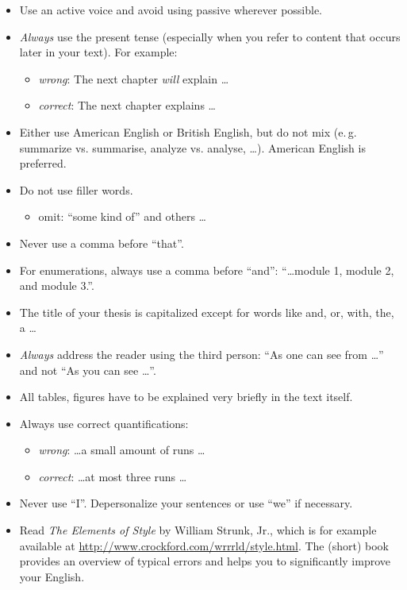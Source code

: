 \begin{itemize}
\item Use an active voice and avoid using passive wherever possible.
\item \emph{Always} use the present tense (especially when you refer to content that occurs later in your text). For example:
	\begin{itemize}
	\item \emph{wrong}: The next chapter \emph{will} explain \dots
	\item \emph{correct}: The next chapter explains \dots
	\end{itemize}
\item Either use American English or British English, but do not mix (e.\,g. summarize vs. summarise, analyze vs. analyse, \dots). American English is preferred.
\item Do not use filler words.
	\begin{itemize}
	\item omit: \enquote{some kind of} and others \dots
	\end{itemize}
\item Never use a comma before \enquote{that}.
\item For enumerations, always use a comma before \enquote{and}: \enquote{\dots module 1, module 2, and module 3.}.
\item The title of your thesis is capitalized except for words like and, or, with, the, a \dots
\item \emph{Always} address the reader using the third person: \enquote{As one can see from \dots} and not \enquote{As you can see \dots}.
\item All tables, figures have to be explained very briefly in the text itself.
\item Always use correct quantifications:
	\begin{itemize}
	\item \emph{wrong}: \dots a small amount of runs \dots
	\item \emph{correct}: \dots at most three runs \dots
	\end{itemize}
\item Never use \enquote{I}. Depersonalize your sentences or use \enquote{we} if necessary.
\item Read \emph{The Elements of Style} by William Strunk, Jr., which is for example available at \url{http://www.crockford.com/wrrrld/style.html}. The (short) book provides an overview of typical errors and helps you to significantly improve your English.
\end{itemize}

